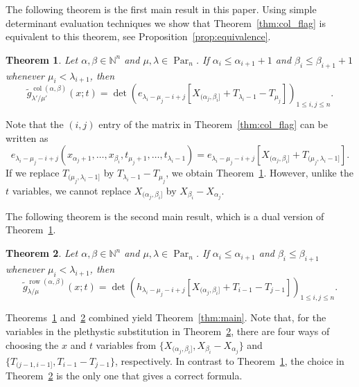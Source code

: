 \documentclass[12pt]{amsart}
\numberwithin{equation}{section}
\newtheorem{thm}{Theorem}[section]
\theoremstyle{definition}
\newcommand\wg{\widetilde{g}}
\newcommand\col{\operatorname{col}}
\newcommand\row{\operatorname{row}}
\newcommand\NN{\mathbb{N}}
\newcommand\Par{\operatorname{Par}}
\begin{document}
The following theorem is the first main result in this paper. Using simple
determinant evaluation techniques we show that Theorem~\ref{thm:col_flag} is
equivalent to this theorem, see Proposition~\ref{prop:equivalence}.


\begin{thm} \label{thm:col_flag2}
  Let $\alpha,\beta\in\NN^n$ and $\mu,\lambda\in\Par_n$.
If $\alpha_i\le \alpha_{i+1}+1$ and $\beta_i\le \beta_{i+1}+1$ whenever
$\mu_i<\lambda_{i+1}$, then
  \[
  \wg_{\lambda'/\mu'}^{\col(\alpha,\beta)}(x;t) = \det \left(
    e_{\lambda_i-\mu_j-i+j}[X_{(\alpha_j,\beta_i]}+T_{\lambda_i-1}-T_{\mu_j}]
  \right)_{1\le i,j\le n}.
\]
\end{thm}

Note that the $(i,j)$ entry of the matrix in Theorem~\ref{thm:col_flag}
can be written as
\[
e_{\lambda_i-\mu_j-i+j}(x_{\alpha_j+1},\dots, x_{\beta_i},t_{\mu_j+1},\dots,t_{\lambda_i-1})
= e_{\lambda_i-\mu_j-i+j}[X_{(\alpha_j,\beta_i]}+T_{(\mu_j,\lambda_i-1]}].
\]
If we replace $T_{(\mu_j,\lambda_i-1]}$ by $T_{\lambda_i-1}-T_{\mu_j}$, we
obtain Theorem~\ref{thm:col_flag2}. However, unlike the $t$ variables, we cannot
replace $X_{(\alpha_j,\beta_i]}$ by $X_{\beta_i}-X_{\alpha_j}$.


The following theorem is the second main result, which is a dual version of
Theorem~\ref{thm:col_flag2}.



\begin{thm}\label{thm:row_flag}
  Let $\alpha,\beta\in\NN^n$ and $\mu,\lambda\in\Par_n$.
If $\alpha_i\le \alpha_{i+1}$ and $\beta_i\le \beta_{i+1}$ whenever
$\mu_i<\lambda_{i+1}$, then
\[
\wg_{\lambda/\mu}^{\row(\alpha,\beta)}(x;t) = \det \left(
      h_{\lambda_i-\mu_j-i+j}[X_{(\alpha_j,\beta_i]}+T_{i-1}-T_{j-1}]
      \right)_{1\le i,j\le n}.
\]
\end{thm}

Theorems~\ref{thm:col_flag2} and~\ref{thm:row_flag} combined yield
Theorem~\ref{thm:main}. Note that, for the variables in the plethystic
substitution in Theorem~\ref{thm:row_flag}, there are four ways of choosing the
$x$ and $t$ variables from $\{X_{(\alpha_j,\beta_i]},X_{\beta_i}-X_{\alpha_j}\}$
and $\{T_{(j-1,i-1]},T_{i-1}-T_{j-1}\}$, respectively. In contrast to
Theorem~\ref{thm:col_flag2}, the choice in Theorem~\ref{thm:row_flag} is the
only one that gives a correct formula.
\end{document}
